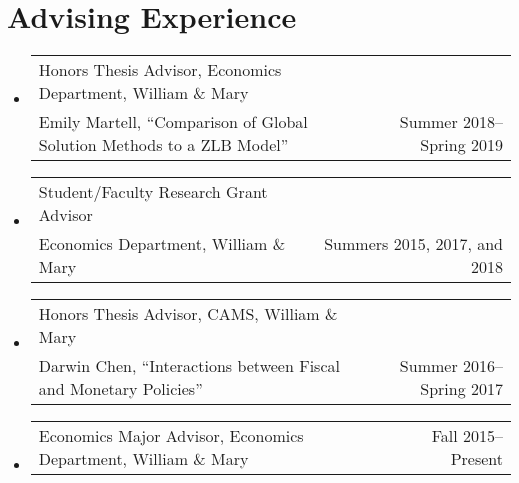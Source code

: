\documentclass[10pt,letterpaper,en-US]{article}
\makeatletter
\newcommand{\itemrow}[2]
{\begin{tabular*}{\linewidth}{l@{\extracolsep{\fill}}r}
	#1 & #2 \\
\end{tabular*}}
\makeatother
\begin{document}
\section*{Advising Experience}
\begin{itemize}
    \item \itemrow{Honors Thesis Advisor, Economics Department, William \& Mary  \\
    Emily Martell, ``Comparison of Global Solution Methods to a ZLB Model''}{Summer 2018--Spring 2019}
    \item \itemrow{Student/Faculty Research Grant Advisor \\
     Economics Department, William \& Mary}{Summers 2015, 2017, and 2018}
    \item \itemrow{Honors Thesis Advisor, CAMS, William \& Mary  \\
    Darwin Chen, ``Interactions between Fiscal and Monetary Policies''}{Summer 2016--Spring 2017}
    \item \itemrow{Economics Major Advisor, Economics Department, William \& Mary}{Fall 2015--Present}
\end{itemize}
\end{document}
